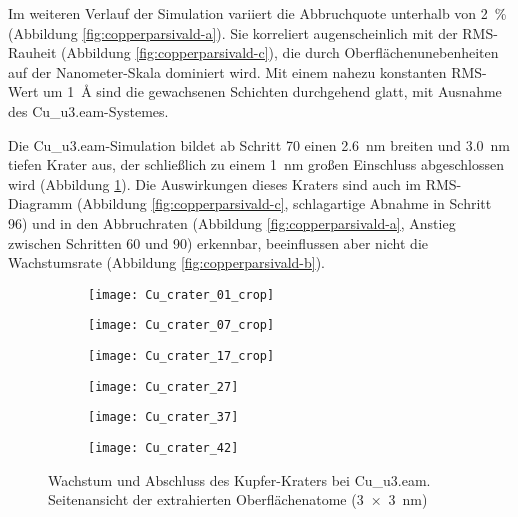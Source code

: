 Im weiteren Verlauf der Simulation variiert die Abbruchquote unterhalb von \SI{2}{\percent} (Abbildung \ref{fig:copperparsivald-a}).
Sie korreliert augenscheinlich mit der RMS-Rauheit (Abbildung \ref{fig:copperparsivald-c}), die durch Oberflächenunebenheiten auf der Nanometer-Skala dominiert wird.
Mit einem nahezu konstanten RMS-Wert um \SI{1}{\angstrom} sind die gewachsenen Schichten durchgehend glatt, mit Ausnahme des Cu\_u3.eam-Systemes.

Die Cu\_u3.eam-Simulation bildet ab Schritt 70 einen \SI{2.6}{\nano\meter} breiten und \SI{3.0}{\nano\meter} tiefen Krater aus, der schließlich zu einem \SI{1}{\nano\meter} großen Einschluss abgeschlossen wird (Abbildung \ref{fig:coppercrater}).
Die Auswirkungen dieses Kraters sind auch im RMS-Diagramm (Abbildung \ref{fig:copperparsivald-c}, schlagartige Abnahme in Schritt 96) und in den Abbruchraten (Abbildung \ref{fig:copperparsivald-a}, Anstieg zwischen Schritten 60 und 90) erkennbar, beeinflussen aber nicht die Wachstumsrate (Abbildung \ref{fig:copperparsivald-b}).

\begin{figure}

  \captionsetup[subfigure]{justification=centering,singlelinecheck=false}
  \def\subfigwidth{0.32\textwidth}

  \begin{subfigure}[t]{\subfigwidth}
    \texttt{[image: Cu\_crater\_01\_crop]}
  \end{subfigure}
  \hfill
  \begin{subfigure}[t]{\subfigwidth}
    \texttt{[image: Cu\_crater\_07\_crop]}
  \end{subfigure}
  \hfill
  \begin{subfigure}[t]{\subfigwidth}
    \texttt{[image: Cu\_crater\_17\_crop]}
  \end{subfigure}

  \begin{subfigure}[t]{\subfigwidth}
    \texttt{[image: Cu\_crater\_27]}
  \end{subfigure}
  \hfill
  \begin{subfigure}[t]{\subfigwidth}
    \texttt{[image: Cu\_crater\_37]}
  \end{subfigure}
  \hfill
  \begin{subfigure}[t]{\subfigwidth}
    \texttt{[image: Cu\_crater\_42]}
  \end{subfigure}

  \caption{Wachstum und Abschluss des Kupfer-Kraters bei Cu\_u3.eam.\\
    Seitenansicht der extrahierten Oberflächenatome (\SI{3x3}{\nano\meter})
  }
  \label{fig:coppercrater}
\end{figure}

